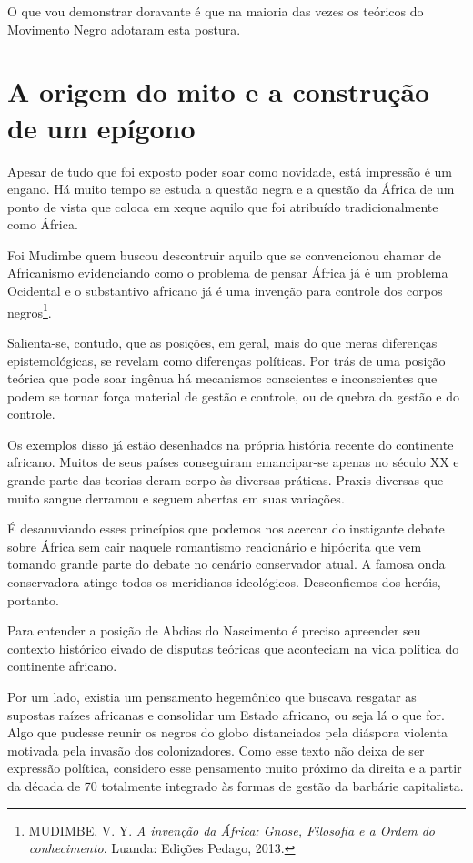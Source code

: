 O que vou demonstrar doravante é que na maioria das vezes os teóricos do
Movimento Negro adotaram esta postura.

\chapter{A origem do mito e a construção de um epígono }

Apesar de tudo que foi exposto poder soar como novidade, está impressão
é um engano. Há muito tempo se estuda a questão negra e a questão da
África de um ponto de vista que coloca em xeque aquilo que foi atribuído
tradicionalmente como África.

Foi Mudimbe quem buscou descontruir aquilo que se convencionou chamar de
Africanismo evidenciando como o problema de pensar África já é um
problema Ocidental e o substantivo africano já é uma invenção para
controle dos corpos negros\footnote{MUDIMBE, V. Y. \emph{A invenção da
  África: Gnose, Filosofia e a Ordem do conhecimento}. Luanda: Edições
  Pedago, 2013.}.

Salienta-se, contudo, que as posições, em geral, mais do que meras
diferenças epistemológicas, se revelam como diferenças políticas. Por
trás de uma posição teórica que pode soar ingênua há mecanismos
conscientes e inconscientes que podem se tornar força material de gestão
e controle, ou de quebra da gestão e do controle.

Os exemplos disso já estão desenhados na própria história recente do
continente africano. Muitos de seus países conseguiram emancipar-se
apenas no século XX e grande parte das teorias deram corpo às diversas
práticas. Praxis diversas que muito sangue derramou e seguem abertas em
suas variações.

É desanuviando esses princípios que podemos nos acercar do instigante
debate sobre África sem cair naquele romantismo reacionário e hipócrita
que vem tomando grande parte do debate no cenário conservador atual. A
famosa onda conservadora atinge todos os meridianos ideológicos.
Desconfiemos dos heróis, portanto.

Para entender a posição de Abdias do Nascimento é preciso apreender seu
contexto histórico eivado de disputas teóricas que aconteciam na vida
política do continente africano.

Por um lado, existia um pensamento hegemônico que buscava resgatar as
supostas raízes africanas e consolidar um Estado africano, ou seja lá o
que for. Algo que pudesse reunir os negros do globo distanciados pela
diáspora violenta motivada pela invasão dos colonizadores. Como esse
texto não deixa de ser expressão política, considero esse pensamento
muito próximo da direita e a partir da década de 70 totalmente integrado
às formas de gestão da barbárie capitalista.

